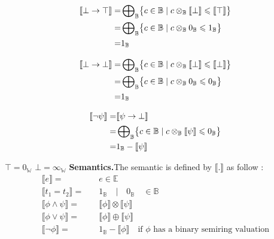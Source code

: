 \documentclass[runningheads]{llncs}
\begin{document}
\begin{align*}
\llbracket \bot \rightarrow \top \rrbracket =  & \sideset{}{_\mathbb{B}}\bigoplus \bigl\{ c \in \mathbb{B} \mid c \otimes_\mathbb{B} \llbracket \bot \rrbracket  \leqslant \llbracket  \top \rrbracket  \bigr\} \\
										    =  & \sideset{}{_\mathbb{B}}\bigoplus \bigl\{ c \in \mathbb{B} \mid c \otimes_\mathbb{B} 0_\mathbb{B}  \leqslant 1_\mathbb{B}  \bigr\} \\
										    =	& 1_\mathbb{B} 
\end{align*}

\begin{align*}
\llbracket \bot \rightarrow \bot \rrbracket =  & \sideset{}{_\mathbb{B}}\bigoplus \bigl\{ c \in \mathbb{B} \mid c \otimes_\mathbb{B} \llbracket \bot \rrbracket  \leqslant \llbracket  \bot \rrbracket  \bigr\} \\
										    =  & \sideset{}{_\mathbb{B}}\bigoplus \bigl\{ c \in \mathbb{B} \mid c \otimes_\mathbb{B} 0_\mathbb{B}  \leqslant 0_\mathbb{B}  \bigr\} \\
										    =	& 1_\mathbb{B} 
\end{align*}

\begin{align*}
\llbracket \neg \psi \rrbracket =  & \llbracket \psi \rightarrow \bot \rrbracket \\
							    =  & \sideset{}{_\mathbb{B}}\bigoplus \bigl\{ c \in \mathbb{B} \mid c \otimes_\mathbb{B} \llbracket \psi \rrbracket \leqslant 0_\mathbb{B}  \bigr\} \\
										    =	& 1_\mathbb{B} - \llbracket \psi \rrbracket
\end{align*}



$\top=0_\mathbb{W}$
$\bot=\infty_\mathbb{W}$
\textbf{Semantics.}The semantic is defined by $\llbracket . \rrbracket$ as follow : \\


\begin{align*}
\llbracket e \rrbracket =  & \quad e \in \mathbb{E} \\
\llbracket t_1=t_2 \rrbracket =  & \quad 1_\mathbb{B} \quad |\quad 0_\mathbb{B} \quad \in \mathbb{B} \\
\llbracket \phi \land \psi \rrbracket =  & \quad \llbracket \phi \rrbracket  \otimes \llbracket \psi \rrbracket \\
\llbracket \phi \lor \psi \rrbracket =  & \quad \llbracket \phi \rrbracket  \oplus \llbracket \psi \rrbracket \\
\llbracket \neg \phi \rrbracket =  & \quad 1_\mathbb{B} - \llbracket \phi \rrbracket \quad  \text{if $\phi$ has a binary semiring valuation}
\end{align*}
\end{document}

